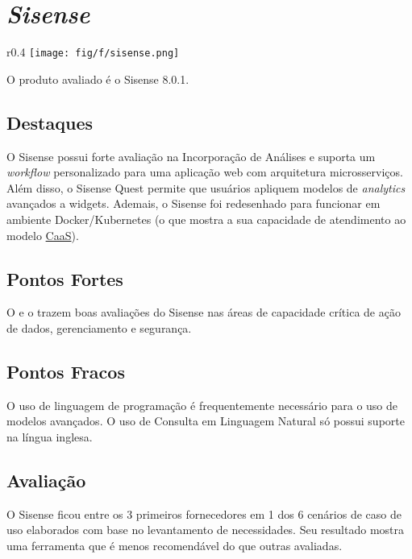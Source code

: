 \section{\emph{Sisense}}
\label{sub-sisense}

\begin{wrapfigure}[4]{r}{0.4\textwidth}     
    \centering
    \texttt{[image: fig/f/sisense.png]}
\end{wrapfigure}

O produto avaliado é o Sisense 8.0.1.

\subsection*{Destaques}

O Sisense possui forte avaliação na Incorporação de Análises e suporta um \emph{workflow} personalizado para uma aplicação web com arquitetura microsserviços. Além disso, o Sisense Quest permite que usuários apliquem modelos de \emph{analytics} avançados a widgets. \cite{gartner:criticalcapabilities} Ademais, o Sisense foi redesenhado para funcionar em ambiente Docker/Kubernetes \cite{gartner:criticalcapabilities} (o que mostra a sua capacidade de atendimento ao modelo \hyperref[caas]{CaaS}).

\subsection*{Pontos Fortes}

O \relGMQ \xspace e o \relGCC \xspace trazem boas avaliações do Sisense nas áreas de capacidade crítica de ação de dados, gerenciamento e segurança.

\subsection*{Pontos Fracos}

O uso de linguagem de programação é frequentemente necessário para o uso de modelos avançados. O uso de Consulta em Linguagem Natural só possui suporte na língua inglesa. 

\subsection*{Avaliação}

O Sisense ficou entre os 3 primeiros fornecedores em 1 dos 6 cenários de caso de uso elaborados com base no levantamento de necessidades. Seu resultado mostra uma ferramenta que é menos recomendável do que outras avaliadas.

